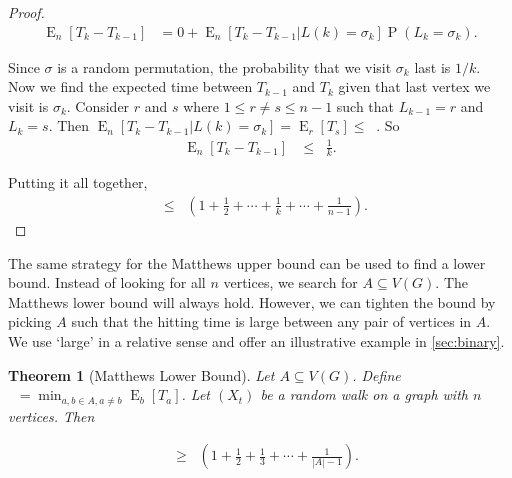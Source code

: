 \documentclass[12pt]{article}
\newtheorem{theorem}{Theorem}
\theoremstyle{definition}
\DeclareMathOperator{\E}{\mathrm{E}}		     %
\DeclareMathOperator{\pr}{\mathrm{P}}		     %
\DeclareMathOperator{\tcov}{t_\textrm{cov}}      %
\DeclareMathOperator{\hit}{t_{\textrm{hit}}}     %
\DeclareMathOperator{\tmina}{t_\textrm{min}^A}   %
\begin{document}
\begin{proof}
\begin{align}
\E_n[T_k - T_{k-1}] &= 0 +
\E_n[T_k - T_{k-1} | L(k) = \sigma_k]
\pr(L_k = \sigma_k). \nonumber 
\end{align}

Since $\sigma$ is a random permutation, the probability that
we visit $\sigma_k$ last is $1/k$.
Now we find the expected time between $T_{k-1}$ and $T_{k}$
given that last vertex we visit is $\sigma_k$.
Consider $r$ and $s$ where $1 \leq r \neq s \leq n-1$
such that $L_{k-1} = r$ and $L_k = s$.
Then $\E_n[T_k - T_{k-1} | L(k) = \sigma_k] = \E_r[T_s] \leq \hit$.
So
\begin{align}
\E_n[T_k - T_{k-1}] &\leq
\hit \frac{1}{k}. \nonumber 
\end{align}

Putting it all together,
\begin{align}
\tcov \leq \hit \left( 1+ \frac{1}{2} + \cdots + \frac{1}{k} 
+ \cdots + \frac{1}{n-1} \right). \nonumber
\end{align}
\end{proof}

The same strategy for the Matthews upper bound can be used
to find a lower bound.
Instead of looking for all $n$ vertices, we search
for $A \subseteq V(G)$.
The Matthews lower bound will always hold.
However, we can tighten the bound by picking $A$ such
that the hitting time is large between any pair of vertices in $A$.
We use `large' in a relative sense and 
offer an illustrative example in \cref{sec:binary}.

\begin{theorem}[Matthews Lower Bound]
Let $A \subseteq V(G)$. Define $\tmina = \min_{a,b\in A, a \neq b} \E_b[T_a]$.
Let $(X_t)$ be a random walk on a graph with $n$ vertices. Then \label{thm:matthews_low}
\end{theorem}
\begin{align}
\tcov &\geq \tmina \left(1 + \frac{1}{2} + \frac{1}{3} + \cdots +
\frac{1}{|A| -1} \right). \nonumber
\end{align}
\end{document}

